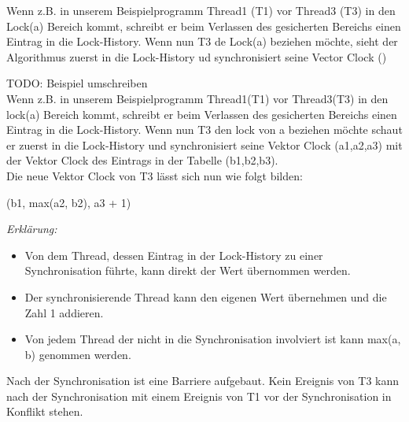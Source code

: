 \documentclass[10pt,a4paper]{article}
\begin{document}
\begin{flushleft}
Wenn z.B. in unserem Beispielprogramm Thread1 (T1) vor Thread3 (T3) in den Lock(a) Bereich kommt, schreibt er beim Verlassen des gesicherten Bereichs einen Eintrag in die Lock-History. Wenn nun T3 de Lock(a) beziehen möchte, sieht der Algorithmus zuerst in die Lock-History ud synchronisiert seine Vector Clock ()

TODO: Beispiel umschreiben\\
Wenn z.B. in unserem Beispielprogramm Thread1(T1) vor Thread3(T3) in den lock(a) Bereich kommt, schreibt er beim Verlassen des gesicherten Bereichs einen Eintrag in die Lock-History. Wenn nun T3 den lock von a beziehen möchte schaut er zuerst in die Lock-History und synchronisiert seine Vektor Clock (a1,a2,a3) mit der Vektor Clock des Eintrags in der Tabelle (b1,b2,b3).\\
Die neue Vektor Clock von T3 lässt sich nun wie folgt bilden: 
\begin{center}(b1, max(a2, b2), a3 + 1)\end{center}
\textit{Erklärung:}
\begin{itemize}
\item Von dem Thread, dessen Eintrag in der Lock-History zu einer Synchronisation führte, kann direkt der Wert übernommen werden.
\item Der synchronisierende Thread kann den eigenen Wert übernehmen und die Zahl 1 addieren.
\item Von jedem Thread der nicht in die Synchronisation involviert ist kann max(a, b) genommen werden.
\end{itemize}
Nach der Synchronisation ist eine Barriere aufgebaut. Kein Ereignis von T3 kann nach der Synchronisation mit einem Ereignis von T1 vor der Synchronisation in Konflikt stehen.
\end{flushleft}
\end{document}
